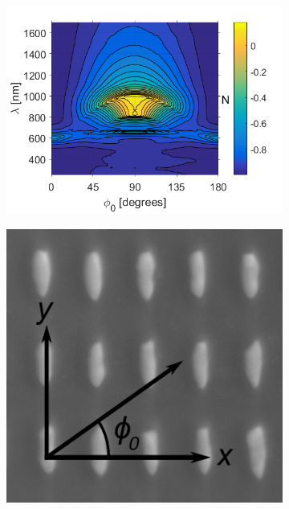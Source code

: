\begin{figure}[h]
    \begin{subfigure}{0.65\textwidth}
        \centering
        \includegraphics[width=\linewidth, trim=0cm 0cm 0.6cm 0cm, clip]{figures/ch4/S5B/LSPR/N_contour(1).png}
        \caption{}
        \label{}
    \end{subfigure}
    \begin{subfigure}{0.34\textwidth}
        \centering
        \includegraphics[width=0.5\linewidth]{figures/Ch3/s5b/S5B_schematic.png}
    \end{subfigure}
    

\end{figure}
